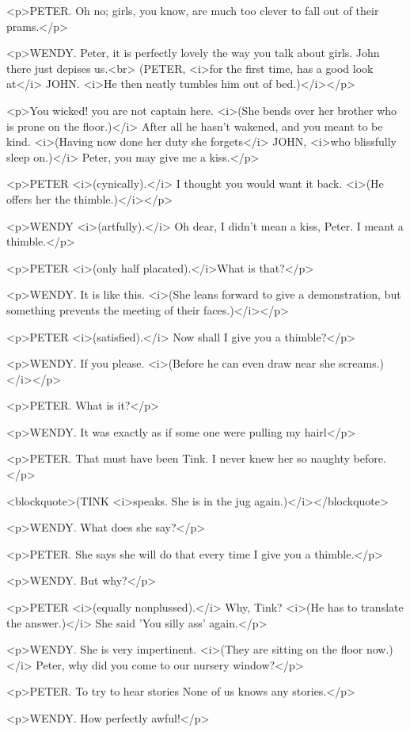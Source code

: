 <p>PETER. Oh no; girls, you know, are much too clever to fall out of their prams.</p>

<p>WENDY. Peter, it is perfectly lovely the way you talk about girls. John there just depises us.<br> (PETER, <i>for the first time, has a good look at</i> JOHN. <i>He then neatly tumbles him out of bed.)</i></p>

<p>You wicked! you are not captain here. <i>(She bends over her brother who is prone on the floor.)</i> After all he hasn't wakened, and you meant to be kind. <i>(Having now done her duty she forgets</i> JOHN, <i>who blissfully sleep on.)</i> Peter, you may give me a kiss.</p>

<p>PETER <i>(cynically).</i> I thought you would want it back. <i>(He offers her the thimble.)</i></p>

<p>WENDY <i>(artfully).</i> Oh dear, I didn't mean a kiss, Peter. I meant a thimble.</p>

<p>PETER <i>(only half placated).</i>What is that?</p>

<p>WENDY. It is like this. <i>(She leans forward to give a demonstration, but something prevents the meeting of their faces.)</i></p>

<p>PETER <i>(satisfied).</i> Now shall I give you a thimble?</p>

<p>WENDY. If you please. <i>(Before he can even draw near she screams.)</i></p>

<p>PETER. What is it?</p>

<p>WENDY. It was exactly as if some one were pulling my hairl</p>

<p>PETER. That must have been Tink. I never knew her so naughty before.</p>

<blockquote>(TINK <i>speaks. She is in the jug again.)</i></blockquote>

<p>WENDY. What does she say?</p>

<p>PETER. She says she will do that every time I give you a thimble.</p>

<p>WENDY. But why?</p>

<p>PETER <i>(equally nonplussed).</i> Why, Tink? <i>(He has to translate the answer.)</i> She said 'You silly ass' again.</p>

<p>WENDY. She is very impertinent. <i>(They are sitting on the floor now.)</i> Peter, why did you come to our nursery window?</p>

<p>PETER. To try to hear stories None of us knows any stories.</p>

<p>WENDY. How perfectly awful!</p>

